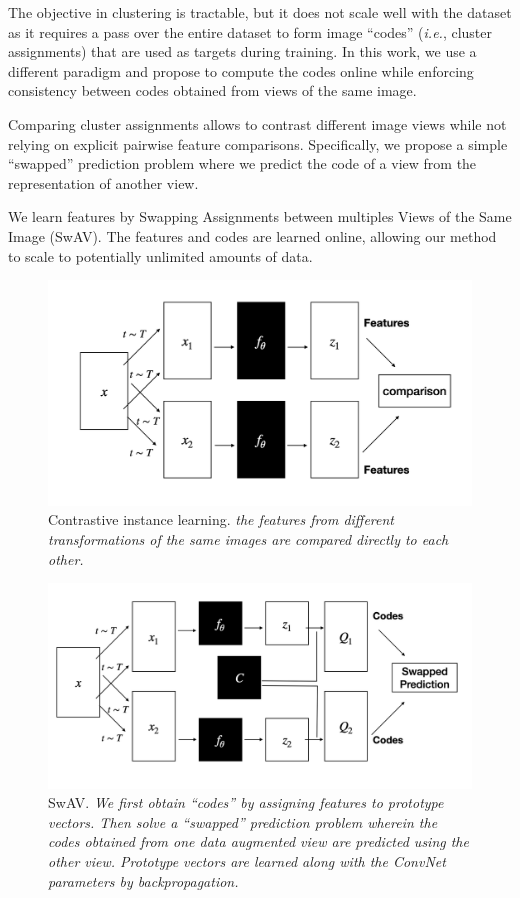\documentclass{tufte-handout}
\begin{document}
The objective in clustering is tractable, but it does not scale well with the dataset as it requires a pass over the entire dataset to form image ``codes'' (\textit{i.e.}, cluster assignments) that are used as targets during training.
In this work, we use a different paradigm and propose to compute the codes online while enforcing consistency between codes obtained from views of the same image.

Comparing cluster assignments allows to contrast different image views while not relying on explicit pairwise feature comparisons.
Specifically, we propose a simple ``swapped'' prediction problem where we predict the code of a view from the representation of another view.

We learn features by Swapping Assignments between multiples Views of the Same Image (SwAV). The features and codes are learned online, allowing our method to scale to potentially unlimited amounts of data.

\begin{figure}
  \includegraphics[scale=5]{instance}
  \caption{Contrastive instance learning.
  \emph{the features from different transformations of the same images are compared directly to each other.}}
  \label{fig:textfig}
\end{figure}

\begin{figure}
  \includegraphics[scale=5]{swav}
  \caption{SwAV.
  \emph{We first obtain ``codes'' by assigning features to prototype vectors. Then solve a ``swapped'' prediction problem wherein the codes obtained from one data augmented view are predicted using the other view.
  Prototype vectors are learned along with the ConvNet parameters by backpropagation.}}
  \label{fig:textfig}
\end{figure}
\end{document}
